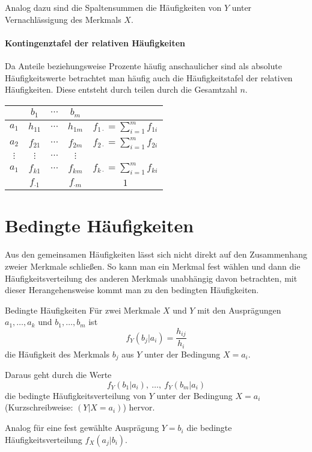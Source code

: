 Analog dazu sind die Spaltensummen die Häufigkeiten von $Y$ unter Vernachlässigung des Merkmals $X$.

\paragraph{Kontingenztafel der relativen Häufigkeiten}
Da Anteile beziehungsweise Prozente häufig anschaulicher sind als absolute Häufigkeitswerte betrachtet man häufig auch die Häufigkeitstafel der relativen Häufigkeiten. Diese entsteht durch teilen durch die Gesamtzahl $n$.

\begin{center}
	\begin{tabular}{c|ccc|c}
		& $b_1$ & $\cdots$ & $b_m$ &\\
		\hline $a_1$ & $h_{11}$ & $\cdots$ & $h_{1m}$&$f_{1\cdot}=\sum_{i=1}^m f_{1i}$\\
		$a_2$ & $f_{21}$ & $\cdots$ & $f_{2m}$&$f_{2\cdot}=\sum_{i=1}^m f_{2i}$\\
		$\vdots$ & $\vdots$ & $\cdots$ & $\vdots$&\\
		$a_1$ & $f_{k1}$ & $\cdots$ & $f_{km}$&$f_{k\cdot}=\sum_{i=1}^m f_{ki}$\\
		\hline &$f_{\cdot1}$&&$f_{\cdot m}$&$1$
	\end{tabular}
\end{center}

\section{Bedingte Häufigkeiten}
Aus den gemeinsamen Häufigkeiten lässt sich nicht direkt auf den Zusammenhang zweier Merkmale schließen.
So kann man ein Merkmal fest wählen und dann die Häufigkeitsverteilung des anderen Merkmals unabhängig davon betrachten, mit dieser Herangehensweise kommt man zu den bedingten Häufigkeiten.

\begin{definition}{Bedingte Häufigkeiten}
	Für zwei Merkmale $X$ und $Y$ mit den Ausprägungen $a_1,\ldots,a_k$ und $b_1,\ldots,b_m$ ist
	\begin{equation*}
		f_Y(b_j|a_i)=\frac{h_{ij}}{h_i}
	\end{equation*}
	die Häufigkeit des Merkmals $b_j$ aus $Y$ unter der Bedingung $X=a_i$.

	Daraus geht durch die Werte 
	\begin{equation*}
		f_Y(b_1|a_i),\ \ldots,\ f_Y(b_m|a_i)
	\end{equation*}
	die bedingte Häufigkeitsverteilung von $Y$ unter der Bedingung $X=a_i$ (Kurzschreibweise: $(Y|X=a_i)$) hervor.

	Analog für eine fest gewählte Ausprägung $Y=b_i$ die bedingte Häufigkeitsverteilung $f_X(a_j|b_i)$.
\end{definition}


